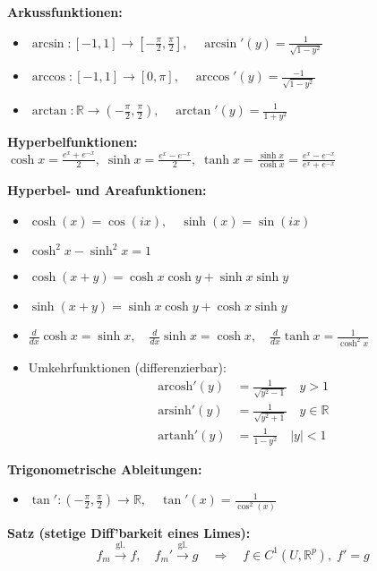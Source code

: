 \textbf{Arkussfunktionen:}
\begin{itemize}
  \item \(\arcsin: [-1, 1] \to \left[-\tfrac{\pi}{2}, \tfrac{\pi}{2}\right], \quad \arcsin'(y) = \frac{1}{\sqrt{1 - y^2}}\)
  \item \(\arccos: [-1, 1] \to [0, \pi], \quad \arccos'(y) = \frac{-1}{\sqrt{1 - y^2}}\)
  \item \(\arctan: \mathbb{R} \to \left(-\tfrac{\pi}{2}, \tfrac{\pi}{2}\right), \quad \arctan'(y) = \frac{1}{1 + y^2}\)
\end{itemize}

\textbf{Hyperbelfunktionen:} \quad
\(\cosh x = \tfrac{e^x + e^{-x}}{2},\;
\sinh x = \tfrac{e^x - e^{-x}}{2},\;
\tanh x = \tfrac{\sinh x}{\cosh x} = \tfrac{e^x - e^{-x}}{e^x + e^{-x}}\)


\textbf{Hyperbel- und Areafunktionen:}
\begin{itemize}
  \item \(\cosh(x) = \cos(ix),\quad \sinh(x) = \sin(ix)\)
  \item \(\cosh^2 x - \sinh^2 x = 1\)
  \item \(\cosh(x+y) = \cosh x \cosh y + \sinh x \sinh y\)
  \item \(\sinh(x+y) = \sinh x \cosh y + \cosh x \sinh y\)
  \item \(\frac{d}{dx} \cosh x = \sinh x,\quad \frac{d}{dx} \sinh x = \cosh x,\quad \frac{d}{dx} \tanh x = \frac{1}{\cosh^2 x}\)
  \item Umkehrfunktionen (differenzierbar):
  \[
  \begin{aligned}
  \text{arcosh}'(y) &= \frac{1}{\sqrt{y^2 - 1}} \quad y > 1 \\
  \text{arsinh}'(y) &= \frac{1}{\sqrt{y^2 + 1}} \quad y \in \mathbb{R} \\
  \text{artanh}'(y) &= \frac{1}{1 - y^2} \quad |y| < 1
  \end{aligned}
  \]
\end{itemize}


\textbf{Trigonometrische Ableitungen:}
\begin{itemize}
  \item \(\tan': \left(-\tfrac{\pi}{2}, \tfrac{\pi}{2}\right) \to \mathbb{R}, \quad \tan'(x) = \frac{1}{\cos^2(x)}\)
\end{itemize}

\textbf{Satz (stetige Diff'barkeit eines Limes):}  
\[
f_m \xrightarrow{\text{gl.}} f,\quad f_m' \xrightarrow{\text{gl.}} g
\quad\Rightarrow\quad f \in C^1(U, \mathbb{R}^p),\; f' = g
\]


